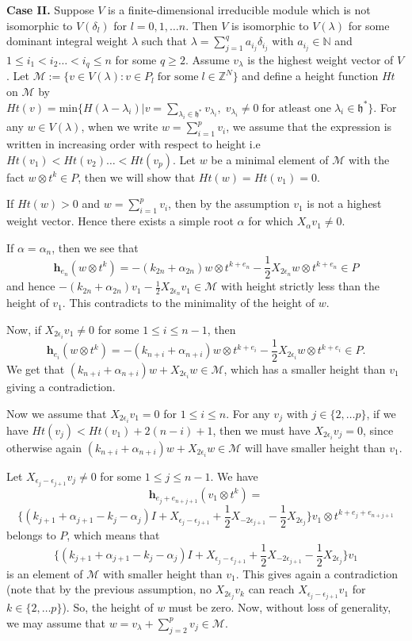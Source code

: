 \documentclass[a4paper,11pt]{amsart}
\numberwithin{equation}{section}
\theoremstyle{plain}
\newcommand{\N}{\mathbb{N}}
\newcommand{\Z}{\mathbb{Z}}
\newcommand{\h}{\mathfrak{h}}
\renewcommand{\H}{\mathbf{h}}
\begin{document}
{\bf Case II.} Suppose $V$ is a finite-dimensional irreducible module which is not isomorphic to $V(\delta_l)$ for $l=0,1,\dots n$. Then  $V$ is isomorphic to $V(\lambda)$ for some dominant integral weight $\lambda$ such that $\lambda=\sum_{j=1}^qa_{i_j}\delta_{i_j}$ with $a_{i_j}\in \N$ and $1\leq i_1<i_2\dots <i_q\leq n$ for some $q\geq 2$. Assume $v_\lambda$ is the highest weight vector of $V$. Let $\mathcal{M}:=\{v\in V(\lambda):v\in P_l\; \text{for some}\; l\in \Z^N\}$ and define a height function $Ht$ on $\mathcal{M}$ by $Ht(v)=\text{min}\{H(\lambda-\lambda_i)|  v=\sum_{\lambda_i \in \h^*} v_{\lambda_i},\; v_{\lambda_i}\neq 0\;  \text{for atleast one}\;  \lambda_i\in \h^*\}$. For any $w\in V(\lambda)$, when we write $w=\sum_{i=1}^pv_i$,  we assume that the expression is written in increasing order with respect to height i.e $Ht(v_1)<Ht(v_2)\dots <Ht(v_p)$. Let $w$ be a minimal element of $\mathcal{M}$ with the fact $w\otimes t^k\in P$, then we will show that $Ht(w)=Ht(v_1)=0$.

If $Ht(w)>0$ and $w=\sum_{i=1}^p v_{i}$, then by the assumption $v_{1}$ is not a highest weight vector. Hence there exists a simple root $\alpha$ for which $X_\alpha v_1\neq 0$.

If $\alpha=\alpha_n$, then we see that $$\H_{e_n}(w\otimes t^k)=-(k_{2n}+\alpha_{2n})w\otimes t^{k+e_n}-\frac{1}{2}X_{2\epsilon_n}w\otimes t^{k+e_n}\in P$$ and hence $-(k_{2n}+\alpha_{2n})v_1-\frac{1}{2}X_{2\epsilon_n}v_1\in \mathcal{M}$ with height strictly less than the height of $v_1$. This contradicts to the minimality of the height of $w$. 

Now, if $X_{2\epsilon_i}v_1\neq 0$ for some $1\leq i\leq n-1$, then $$\H_{e_i}(w\otimes t^k)=-(k_{n+i}+\alpha_{n+i})w\otimes t^{k+e_i}-\frac{1}{2}X_{2\epsilon_i}w\otimes t^{k+e_i} \in P.$$ We get that $(k_{n+i}+\alpha_{n+i})w+X_{2\epsilon_i}w\in \mathcal{M}$, which has a smaller height than $v_1$ giving a contradiction. 

Now we assume that $X_{2\epsilon_i} v_1=0$  for $1\leq i\leq n$. For any $v_j$ with $j\in \{2,\dots p\}$, if we have $Ht(v_j)<Ht(v_1)+2(n-i)+1$, then we must have $X_{2\epsilon_i}v_j=0$, since otherwise again $(k_{n+i}+\alpha_{n+i})w+X_{2\epsilon_i}w\in \mathcal{M}$ will have smaller height than $v_1$.  

 
 Let  $X_{\epsilon_j-\epsilon_{j+1}}v_j\neq 0$ for some $1\leq j\leq n-1$. We have $$\H_{e_j+e_{n+j+1}}(v_1\otimes t^k)=$$
 $$\{(k_{j+1}+\alpha_{j+1}-k_j-\alpha_j)I+X_{\epsilon_j-\epsilon_{j+1}}+\frac{1}{2}X_{-2\epsilon_{j+1}}-\frac{1}{2}X_{2\epsilon_{j}}\}v_1\otimes t^{k+e_j+e_{n+j+1}}$$ belongs to $P$, which means that $$\{(k_{j+1}+\alpha_{j+1}-k_j-\alpha_j)I+X_{\epsilon_j-\epsilon_{j+1}}+\frac{1}{2}X_{-2\epsilon_{j+1}}-\frac{1}{2}X_{2\epsilon_{j}}\}v_1$$ is an element of $\mathcal{M}$ with smaller height than $v_1$.
 This gives again a contradiction (note that by the previous assumption, no $X_{2\epsilon_j}v_k$ can reach  $X_{\epsilon_j-\epsilon_{j+1}}v_1$ for $k\in \{2,\dots p\}$). So, the height of $w$ must be zero. Now, without loss of generality, we may assume that $w=v_\lambda+\sum_{j=2}^pv_j\in \mathcal{M}$.
\end{document}
